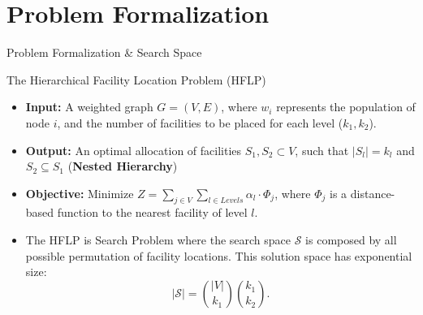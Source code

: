 \documentclass[11pt]{beamer}
\begin{document}
\section{Problem Formalization}
\begin{frame}{Problem Formalization \& Search Space}
  
  \begin{block}{The Hierarchical Facility Location Problem (HFLP)}
    \begin{itemize}
        \item \textbf{Input:} A weighted graph $G=(V, E)$, where $w_i$ represents the population of node $i$, and the number of facilities to be placed for each level ($k_1, k_2$).
        \item \textbf{Output:} An optimal allocation of facilities $S_1, S_2 \subset V$, such that $|S_l| = k_l$ and $S_2 \subseteq S_1$ (\textbf{Nested Hierarchy})
        \item \textbf{Objective:} Minimize $Z = \sum_{j\in V} \sum_{l \in Levels} \alpha_l \cdot \Phi_j$, where $\Phi_j$ is a distance-based function to the nearest facility of level $l$.
    \end{itemize}
  \end{block}

  \vfill

  \begin{itemize}
    \item The HFLP is Search Problem where the search space
    $\mathcal{S}$ is composed by all possible permutation of facility locations. 
    This solution space has exponential size:
  \[
  |\mathcal{S}| = \binom{|V|}{k_1} \binom{k_1}{k_2}.
  \]
  \end{itemize}
  \vfill
\end{frame}

\end{document}

